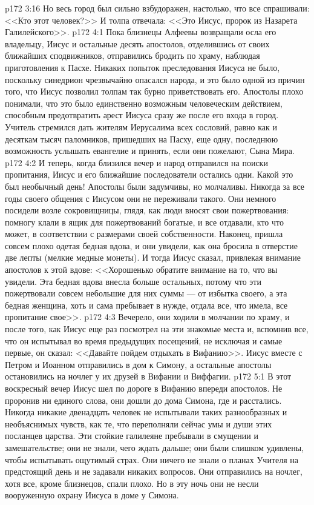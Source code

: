 \vs p172 3:16 Но весь город был сильно взбудоражен, настолько, что все спрашивали: <<Кто этот человек?>> И толпа отвечала: <<Это Иисус, пророк из Назарета Галилейского>>.
\vs p172 4:1 Пока близнецы Алфеевы возвращали осла его владельцу, Иисус и остальные десять апостолов, отделившись от своих ближайших сподвижников, отправились бродить по храму, наблюдая приготовления к Пасхе. Никаких попыток преследования Иисуса не было, поскольку синедрион чрезвычайно опасался народа, и это было одной из причин того, что Иисус позволил толпам так бурно приветствовать его. Апостолы плохо понимали, что это было единственно возможным человеческим действием, способным предотвратить арест Иисуса сразу же после его входа в город. Учитель стремился дать жителям Иерусалима всех сословий, равно как и десяткам тысяч паломников, пришедших на Пасху, еще одну, последнюю возможность услышать евангелие и принять, если они пожелают, Сына Мира.
\vs p172 4:2 И теперь, когда близился вечер и народ отправился на поиски пропитания, Иисус и его ближайшие последователи остались одни. Какой это был необычный день! Апостолы были задумчивы, но молчаливы. Никогда за все годы своего общения с Иисусом они не переживали такого. Они немного посидели возле сокровищницы, глядя, как люди вносят свои пожертвования: помногу клали в ящик для пожертвований богатые, и все отдавали, кто что может, в соответствии с размерами своей собственности. Наконец, пришла совсем плохо одетая бедная вдова, и они увидели, как она бросила в отверстие две лепты (мелкие медные монеты). И тогда Иисус сказал, привлекая внимание апостолов к этой вдове: <<Хорошенько обратите внимание на то, что вы увидели. Эта бедная вдова внесла больше остальных, потому что эти пожертвовали совсем небольшие для них суммы --- от избытка своего, а эта бедная женщина, хоть и сама пребывает в нужде, отдала все, что имела, все пропитание свое>>.
\vs p172 4:3 Вечерело, они ходили в молчании по храму, и после того, как Иисус еще раз посмотрел на эти знакомые места и, вспомнив все, что он испытывал во время предыдущих посещений, не исключая и самые первые, он сказал: <<Давайте пойдем отдыхать в Вифанию>>. Иисус вместе с Петром и Иоанном отправились в дом к Симону, а остальные апостолы остановились на ночлег у их друзей в Вифании и Виффагии.
\vs p172 5:1 В этот воскресный вечер Иисус шел по дороге в Вифанию впереди апостолов. Не проронив ни единого слова, они дошли до дома Симона, где и расстались. Никогда никакие двенадцать человек не испытывали таких разнообразных и необъяснимых чувств, как те, что переполняли сейчас умы и души этих посланцев царства. Эти стойкие галилеяне пребывали в смущении и замешательстве; они не знали, чего ждать дальше; они были слишком удивлены, чтобы испытывать ощутимый страх. Они ничего не знали о планах Учителя на предстоящий день и не задавали никаких вопросов. Они отправились на ночлег, хотя все, кроме близнецов, спали плохо. Но в эту ночь они не несли вооруженную охрану Иисуса в доме у Симона.
